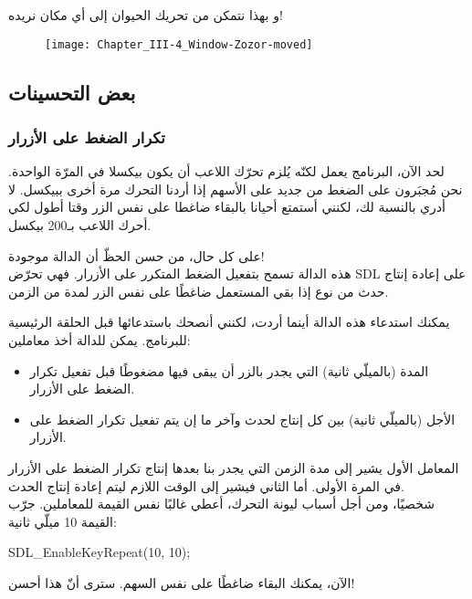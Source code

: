 و بهذا نتمكن من تحريك الحيوان إلى أي مكان نريده!

\begin{figure}[H]
	\centering
	\texttt{[image: Chapter\_III-4\_Window-Zozor-moved]}
\end{figure}

\subsection{بعض التحسينات}

\subsubsection{تكرار الضغط على الأزرار}

لحد الآن، البرنامج يعمل لكنّه يُلزم تحرّك اللاعب أن يكون بيكسلا في المرّة الواحدة. نحن مُجبَرون على الضغط من جديد على الأسهم إذا أردنا التحرك مرة أخرى ببيكسل. لا أدري بالنسبة لك، لكنني أستمتع أحيانا بالبقاء ضاغطا على نفس الزر وقتا أطول لكي أحرك اللاعب بـ200 بيكسل.

على كل حال، من حسن الحظّ أن الدالة 
موجودة!\\
هذه الدالة تسمح بتفعيل الضغط المتكرر على الأزرار. فهي تحرّض
\textenglish{SDL}
على إعادة إنتاج حدث من نوع
إذا بقي المستعمل ضاغطًا على نفس الزر لمدة من الزمن.

يمكنك استدعاء هذه الدالة أينما أردت، لكنني أنصحك باستدعائها قبل الحلقة الرئيسية للبرنامج. يمكن للدالة أخذ معاملين:

\begin{itemize}
	\item المدة (بالميلّي ثانية) التي يجدر بالزر أن يبقى فيها مضغوطًا قبل تفعيل تكرار الضغط على الأزرار.
	\item الأجل (بالميلّي ثانية) بين كل إنتاج لحدث
	وآخر ما إن يتم تفعيل تكرار الضغط على الأزرار.
\end{itemize}

المعامل الأول يشير إلى مدة الزمن التي يجدر بنا بعدها إنتاج تكرار الضغط على الأزرار في المرة الأولى. أما الثاني فيشير إلى الوقت اللازم ليتم إعادة إنتاج الحدث.\\
شخصيًا، ومن أجل أسباب ليونة التحرك، أعطي غالبًا نفس القيمة للمعاملين. جرّب القيمة 10 ميلّي ثانية:

\begin{Csource}
SDL_EnableKeyRepeat(10, 10);
\end{Csource}

الآن، يمكنك البقاء ضاغطًا على نفس السهم. سترى أنّ هذا أحسن!

